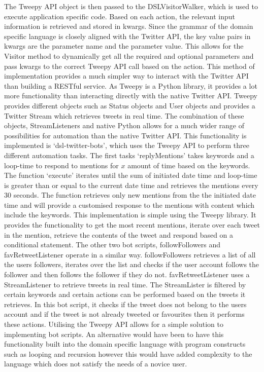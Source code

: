 The Tweepy API object is then passed to the DSLVisitorWalker, which is used to execute application specific code. Based on each action, the relevant input information is retrieved and stored in kwargs. Since the grammar of the domain specific language is closely aligned with the Twitter API, the key value pairs in kwargs are the parameter name and the parameter value. This allows for the Visitor method to dynamically get all the required and optional parameters and pass kwargs to the correct Tweepy API call based on the action. This method of implementation provides a much simpler way to interact with the Twitter API than building a RESTful service. As Tweepy is a Python library, it provides a lot more functionality than interacting directly with the native Twitter API. Tweepy provides different objects such as Status objects and User objects and provides a Twitter Stream which retrieves tweets in real time. The combination of these objects, StreamListeners and native Python allows for a much wider range of possibilities for automation than the native Twitter API. This functionality is implemented is `dsl-twitter-bots', which uses the Tweepy API to perform three different automation tasks. The first tasks `replyMentions' takes keywords and a loop-time to respond to mentions for $x$ amount of time based on the keywords. The function `execute' iterates until the sum of initiated date time and loop-time is greater than or equal to the current date time and retrieves the mentions every 30 seconds. The function retrieves only new mentions from the the initiated date time and will provide a customised response to the mentions with content which include the keywords. This implementation is simple using the Tweepy library. It provides the functionality to get the most recent mentions, iterate over each tweet in the mention, retrieve the contents of the tweet and respond based on a conditional statement. The other two bot scripts, followFollowers and favRetweetListener operate in a similar way. followFollowers retrieves a list of all the users followers, iterates over the list and checks if the user account follows the follower and then follows the follower if they do not. favRetweetListener uses a StreamListener to retrieve tweets in real time. The StreamLister is filtered by certain keywords and certain actions can be performed based on the tweets it retrieves. In this bot script, it checks if the tweet does not belong to the users account and if the tweet is not already tweeted or favourites then it performs these actions. Utilising the Tweepy API allows for a simple solution to implementing bot scripts. An alternative would have been to have this functionality built into the domain specific language with program constructs such as looping and recursion however this would have added complexity to the language which does not satisfy the needs of a novice user.

